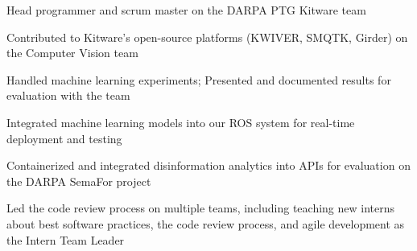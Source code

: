 \documentclass[]{deedy-resume-reversed}
\begin{document}
\begin{minipage}[t]{0.68\textwidth}
\begin{tightemize}
\item Head programmer and scrum master on the DARPA PTG Kitware team
\item Contributed to Kitware’s open-source platforms (KWIVER, SMQTK, Girder) on the Computer Vision team
\item Handled machine learning experiments; Presented and documented results for evaluation with the team
\item Integrated machine learning models into our ROS system for real-time deployment and testing
\item Containerized and integrated disinformation analytics into APIs for evaluation on the DARPA SemaFor project
\item Led the code review process on multiple teams, including teaching new interns about best software practices, the code review process, and agile development as the Intern Team Leader
\end{tightemize}
\sectionsep


\end{minipage}
\end{document}
